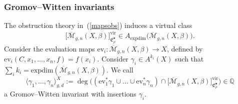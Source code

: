 \documentclass[pdftex]{sigma}
\numberwithin{equation}{section}
\newcommand{\vv}{\mathrm{vir}}
\newcommand{\E}{\mathfrak E}
\begin{document}
\subsubsection{Gromov--Witten invariants}The obstruction theory in~(\ref{mapsobs}) induces a virtual class
\[
\big[\overline{\mathcal{M}}_{g,n}(X,\beta)\big]^{\vv}_{\E^{\bullet}_{\rho}}\in A_{\mathrm{expdim}}\big(\overline{\mathcal{M}}_{g,n}(X,\beta)\big).
\]
Consider the evaluation maps $\mathrm{ev}_i\colon \overline{\mathcal{M}}_{g,n}(X,\beta)\to X$, defined by $\mathrm{ev}_i(C, x_1,\dots,x_n,f)=f(x_i)$.
Consider $\gamma_i\in A^{k_i}(X)$ such that $\sum_i{k_i}=\mathrm{expdim}(\overline{\mathcal{M}}_{g,n}(X,\beta))$. We call
\[
\langle \gamma_1,\ldots,\gamma_n\rangle^X_{g,d}:=\deg\big(( \mathrm{ev}_1^*\gamma_1\cup\dots\cup \mathrm{ev}_n^*\gamma_n)\cap \big[\overline{\mathcal{M}}_{g,n}(X,\beta)\big]^{\vv}_{\E^{\bullet}_{\rho}}\big)\in \mathbb{Q}
\]
a Gromov--Witten invariant with insertions $\gamma_i$.
\end{document}
